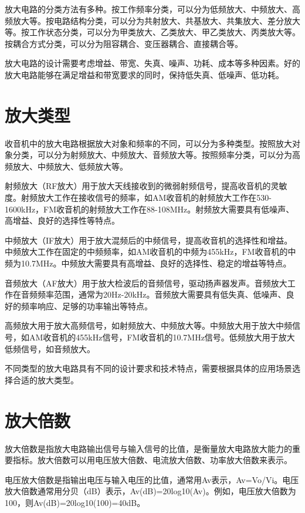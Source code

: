 \documentclass[12pt,UTF8]{ctexbook}
\begin{document}
放大电路的分类方法有多种。按工作频率分类，可以分为低频放大、中频放大、高频放大等。按电路结构分类，可以分为共射放大、共基放大、共集放大、差分放大等。按工作状态分类，可以分为甲类放大、乙类放大、甲乙类放大、丙类放大等。按耦合方式分类，可以分为阻容耦合、变压器耦合、直接耦合等。

放大电路的设计需要考虑增益、带宽、失真、噪声、功耗、成本等多种因素。好的放大电路能够在满足增益和带宽要求的同时，保持低失真、低噪声、低功耗。

\section{放大类型}

收音机中的放大电路根据放大对象和频率的不同，可以分为多种类型。按照放大对象分类，可以分为射频放大、中频放大、音频放大等。按照频率分类，可以分为高频放大、中频放大、低频放大等。

射频放大（RF放大）用于放大天线接收到的微弱射频信号，提高收音机的灵敏度。射频放大工作在接收信号的频率，如AM收音机的射频放大工作在530-1600kHz，FM收音机的射频放大工作在88-108MHz。射频放大需要具有低噪声、高增益、良好的选择性等特点。

中频放大（IF放大）用于放大混频后的中频信号，提高收音机的选择性和增益。中频放大工作在固定的中频频率，如AM收音机的中频为455kHz，FM收音机的中频为10.7MHz。中频放大需要具有高增益、良好的选择性、稳定的增益等特点。

音频放大（AF放大）用于放大检波后的音频信号，驱动扬声器发声。音频放大工作在音频频率范围，通常为20Hz-20kHz。音频放大需要具有低失真、低噪声、良好的频率响应、足够的功率输出等特点。

高频放大用于放大高频信号，如射频放大、中频放大等。中频放大用于放大中频信号，如AM收音机的455kHz信号，FM收音机的10.7MHz信号。低频放大用于放大低频信号，如音频放大。

不同类型的放大电路具有不同的设计要求和技术特点，需要根据具体的应用场景选择合适的放大类型。

\section{放大倍数}

放大倍数是指放大电路输出信号与输入信号的比值，是衡量放大电路放大能力的重要指标。放大倍数可以用电压放大倍数、电流放大倍数、功率放大倍数来表示。

电压放大倍数是指输出电压与输入电压的比值，通常用Av表示，Av=Vo/Vi。电压放大倍数通常用分贝（dB）表示，Av(dB)=20log10(Av)。例如，电压放大倍数为100，则Av(dB)=20log10(100)=40dB。
\end{document}

